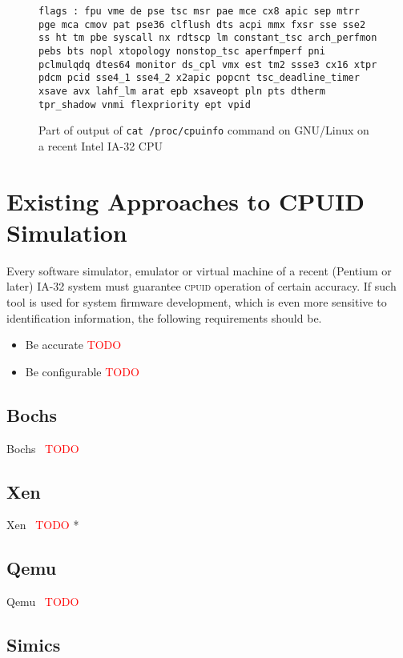 \documentclass[a4paper,10pt,oneside,unicode]{article}
\newcommand{\cpuid}{\textsc{cpuid} }
\newcommand{\todo}[1][]{\textcolor{red}{TODO #1}}
\begin{document}
\begin{figure}
\noindent\texttt{flags           : fpu vme de pse tsc msr pae mce cx8 apic sep mtrr pge mca cmov pat pse36 clflush dts acpi mmx fxsr sse sse2 ss ht tm pbe syscall nx rdtscp lm constant\_tsc arch\_perfmon pebs bts nopl xtopology nonstop\_tsc aperfmperf pni pclmulqdq dtes64 monitor ds\_cpl vmx est tm2 ssse3 cx16 xtpr pdcm pcid sse4\_1 sse4\_2 x2apic popcnt tsc\_deadline\_timer xsave avx lahf\_lm arat epb xsaveopt pln pts dtherm tpr\_shadow vnmi flexpriority ept vpid
}
\caption{Part of output of \texttt{cat /proc/cpuinfo} command on GNU/Linux on a recent Intel IA-32 {CPU}}\label{fig:flags}
\end{figure}

\section{Existing Approaches to CPUID Simulation}\label{sec:approaches}

Every software simulator, emulator or virtual machine of a recent (Pentium or later) IA-32 system must guarantee \cpuid operation of certain accuracy. If such tool is used for system firmware development, which is even more sensitive to identification information, the following requirements should be.

\begin{itemize}
\item Be accurate \todo
\item Be configurable \todo
\end{itemize}

\subsection{Bochs}

Bochs~\cite{bochs} \todo 

\subsection{Xen}

Xen~\cite{xen2006} \todo *

\subsection{Qemu}

Qemu~\cite{qemu} \todo 

\subsection{Simics}
\end{document}

